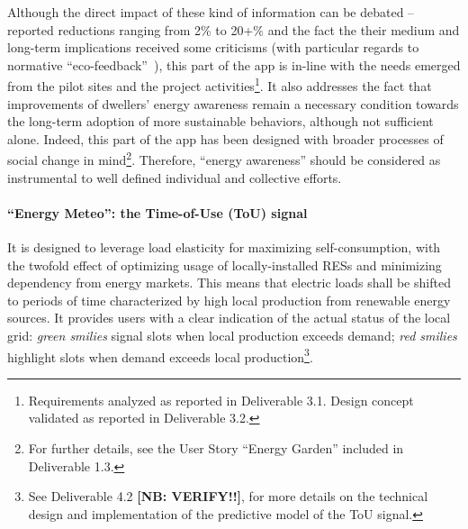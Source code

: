 Although the direct impact of these kind of information can be debated -- reported reductions ranging from 2\% to 20+\% \citep{eea_report} and the fact the their medium and
long-term implications received some criticisms (with particular regards to normative ``eco-feedback''~\citep{Strengers2012,Cakici2014}), this part of the app is in-line with the needs emerged from
the pilot sites and the project activities\footnote{Requirements analyzed as reported in Deliverable 3.1. Design concept validated as reported in Deliverable 3.2.}.
It also addresses the fact that improvements of dwellers' energy awareness remain a necessary condition towards the long-term adoption of more sustainable behaviors,
although not sufficient alone. Indeed, this part of the app has been designed with broader processes of social change
in mind\footnote{For further details, see the User Story ``Energy Garden'' included in Deliverable 1.3.}. Therefore, ``energy awareness'' should be considered as instrumental to
well defined individual and collective efforts. 


\paragraph{``Energy Meteo'': the Time-of-Use (ToU) signal} 
It is designed to leverage load elasticity for maximizing self-consumption, with the twofold effect of optimizing usage of locally-installed RESs and minimizing dependency from energy markets. This means that electric loads shall be shifted to periods of time characterized by high local production from renewable energy sources.
It provides users with a clear indication of the actual status of the local grid: \textit{green smilies} signal slots when local production exceeds demand; \textit{red smilies} highlight slots
when demand exceeds local production\footnote{See Deliverable 4.2 \textbf{[NB: VERIFY!!]}, for more details on the technical design and implementation of the predictive model of the ToU signal.}.

